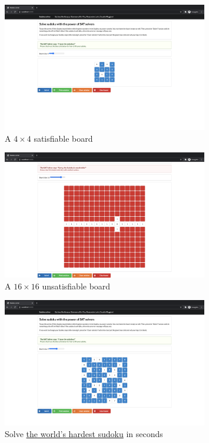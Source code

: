 \documentclass[]{usiinfprospectus}
\begin{document}
\begin{figure}[ht]
\centering
\includegraphics[width=0.8\textwidth]{pics/grid_4.png}
\caption{A $ 4 \times 4 $ satisfiable board}
\end{figure}

\begin{figure}[ht]
\centering
\includegraphics[width=0.8\textwidth]{pics/grid_16.png}
\caption{A $ 16 \times 16 $ unsatisfiable board}
\end{figure}

\begin{figure}[ht]
\centering
\includegraphics[width=0.8\textwidth]{pics/hardest_sudoku.png}
\caption{Solve \href{https://www.mirror.co.uk/news/weird-news/worlds-hardest-sudoku-can-you-242294}{the world's hardest sudoku} in seconds}
\end{figure}



\end{document}
